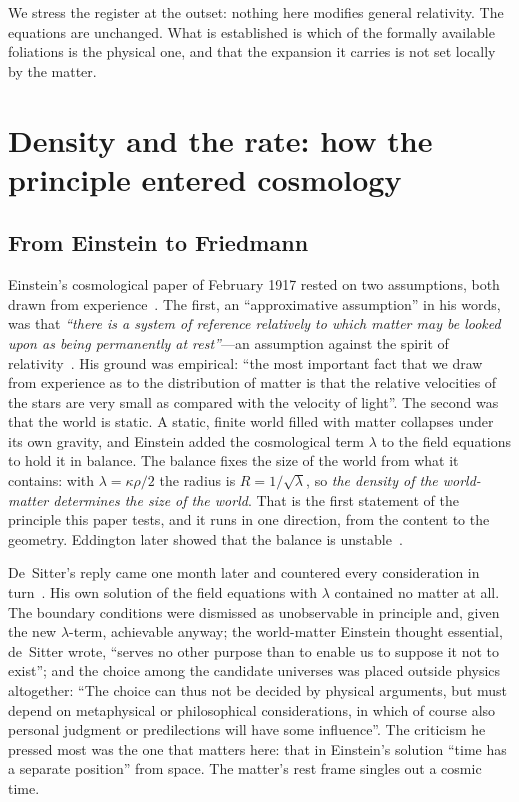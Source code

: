 \documentclass[twocolumn]{aastex701}
\begin{document}
We stress the register at the outset: nothing here modifies general relativity. The equations are unchanged. What is established is which of the formally available foliations is the physical one, and that the expansion it carries is not set locally by the matter.

\section{Density and the rate: how the principle entered cosmology}\label{sec:principle}

\subsection{From Einstein to Friedmann}\label{sec:history}

Einstein's cosmological paper of February 1917 rested on two assumptions, both drawn from experience~\citep{Einstein1917}. The first, an ``approximative assumption'' in his words, was that \emph{``there is a system of reference relatively to which matter may be looked upon as being permanently at rest''}---an assumption against the spirit of relativity~\citep{JanzenEinsteinCosmology}. His ground was empirical: ``the most important fact that we draw from experience as to the distribution of matter is that the relative velocities of the stars are very small as compared with the velocity of light''. The second was that the world is static. A static, finite world filled with matter collapses under its own gravity, and Einstein added the cosmological term $\lambda$ to the field equations to hold it in balance. The balance fixes the size of the world from what it contains: with $\lambda=\kappa\rho/2$ the radius is $R=1/\sqrt{\lambda}$, so \emph{the density of the world-matter determines the size of the world}. That is the first statement of the principle this paper tests, and it runs in one direction, from the content to the geometry. Eddington later showed that the balance is unstable~\citep{Eddington1930}.

De~Sitter's reply came one month later and countered every consideration in turn~\citep{deSitter1917}. His own solution of the field equations with $\lambda$ contained no matter at all. The boundary conditions were dismissed as unobservable in principle and, given the new $\lambda$-term, achievable anyway; the world-matter Einstein thought essential, de~Sitter wrote, ``serves no other purpose than to enable us to suppose it not to exist''; and the choice among the candidate universes was placed outside physics altogether: ``The choice can thus not be decided by physical arguments, but must depend on metaphysical or philosophical considerations, in which of course also personal judgment or predilections will have some influence''. The criticism he pressed most was the one that matters here: that in Einstein's solution ``time has a separate position'' from space. The matter's rest frame singles out a cosmic time.
\end{document}
